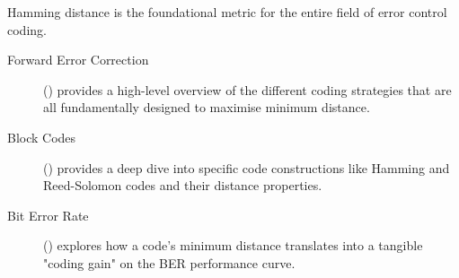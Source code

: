 \begin{importantbox}[title={Further Reading}]
    Hamming distance is the foundational metric for the entire field of error control coding.
    \begin{description}
        \item[Forward Error Correction] () provides a high-level overview of the different coding strategies that are all fundamentally designed to maximise minimum distance.
        \item[Block Codes] () provides a deep dive into specific code constructions like Hamming and Reed-Solomon codes and their distance properties.
        \item[Bit Error Rate] () explores how a code's minimum distance translates into a tangible "coding gain" on the BER performance curve.
    \end{description}
\end{importantbox}